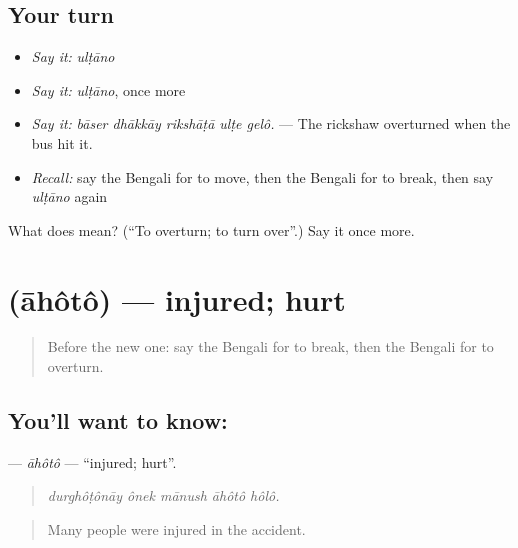 \subsection*{Your turn}
\begin{itemize}
\raggedright
  \item \emph{Say it:} \emph{ulṭāno}
  \item \emph{Say it:} \emph{ulṭāno}, once more
  \item \emph{Say it:} \emph{bāser dhākkāy rikshāṭā ulṭe gelô.} — The rickshaw overturned when the bus hit it.
  \item \emph{Recall:} say the Bengali for to move, then the Bengali for to break, then say \emph{ulṭāno} again
\end{itemize}

\begin{tcolorbox}[breakable,colback=teal!4,colframe=teal!35!black,title={Before you move on}]
What does  mean? (\textquotedblleft{}To overturn; to turn over\textquotedblright{}.) Say it once more.
\end{tcolorbox}
\section[\texorpdfstring{\bn{আহত} (āhôtô)}{আহত (āhôtô)}]{ (āhôtô) — injured; hurt}

\label{lesson:BN-C278-ahoto}



\begin{quote}
Before the new one: say the Bengali for to break, then the Bengali for to overturn.
\end{quote}

\subsection*{You'll want to know: }
\textbf{} — \emph{āhôtô} — \textquotedblleft{}injured; hurt\textquotedblright{}.

\begin{quote}
    
\end{quote}

\begin{quote}
\emph{durghôṭônāy ônek mānush āhôtô hôlô.}
\end{quote}

\begin{quote}
Many people were injured in the accident.
\end{quote}

